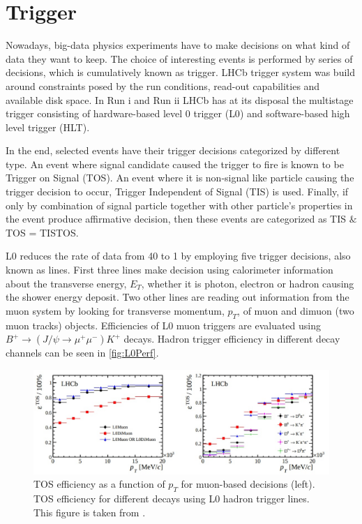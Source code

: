 \section{Trigger }
\label{triggerchap}
Nowadays, big-data physics experiments have to make decisions on what kind of data they want to keep. The choice of interesting events is performed by series of decisions, which is cumulatively known as trigger. \Gls{LHCb} trigger system was build around constraints posed by the run conditions, read-out capabilities and available disk space. In Run \Rn{1} and Run \Rn{2} \gls{LHCb} has at its disposal the multistage trigger consisting of hardware-based level 0 trigger (\Gls{L0}) and software-based high level trigger (\Gls{HLT}).

In the end, selected events have their trigger decisions categorized by different type.  An event where signal candidate caused the trigger to fire is known to be Trigger on Signal (\Gls{TOS}). An event where it is non-signal like particle causing the trigger decision to occur, Trigger Independent of Signal (\Gls{TIS}) is used. Finally, if only by combination of signal particle together with other particle's properties in the event produce affirmative decision, then these events are categorized as \Gls{TIS} $\&$ \Gls{TOS} = \Gls{TISTOS}.

\Gls{L0} reduces the rate of data from 40 \mhz to 1 \mhz by employing five trigger decisions, also known as lines. First three lines make decision using calorimeter information about the transverse energy, $E_{T}$, whether it is photon, electron or hadron causing the shower energy deposit. Two other lines are reading out information from the muon system by looking for transverse momentum, $p_{T}$, of muon and dimuon (two muon tracks) objects. Efficiencies of L0 muon triggers are evaluated using $B^{+} \rightarrow (J/\psi \rightarrow \mu^{+} \mu^{-}) K^{+}$ decays. Hadron trigger efficiency in different decay channels can be seen in \autoref{fig:L0Perf}. 


\begin{figure}[!h]
	\centering
	\includegraphics[width = 1.0\textwidth]{figs/detector/L0performance.eps}%
	\caption{ \Gls{TOS} efficiency as a function of $p_{T}$ for muon-based decisions (left).         \Gls{TOS} efficiency for different decays using L0 hadron trigger lines. This figure is taken from \cite{LHCb-DP-2012-002}. }  
	\label{fig:L0Perf}
\end{figure}


